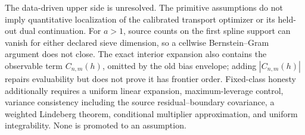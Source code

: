 The data-driven upper side is unresolved. The primitive assumptions do not imply quantitative localization of the calibrated transport optimizer or its held-out dual continuation. For \(a>1\), source counts on the first spline support can vanish for either declared sieve dimension, so a cellwise Bernstein--Gram argument does not close. The exact interior expansion also contains the observable term \(C_{n,m}(h)\), omitted by the old bias envelope; adding \(|C_{n,m}(h)|\) repairs evaluability but does not prove it has frontier order. Fixed-class honesty additionally requires a uniform linear expansion, maximum-leverage control, variance consistency including the source residual--boundary covariance, a weighted Lindeberg theorem, conditional multiplier approximation, and uniform integrability. None is promoted to an assumption.